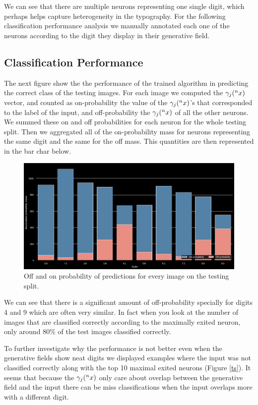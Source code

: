 \documentclass{article}
\begin{document}
We can see that there are multiple neurons representing one single digit, which perhaps helps capture heterogeneity in the typography. For the following classification performance analysis we manually annotated each one of the neurons according to the digit they display in their generative field. 

\subsection{Classification Performance}
The next figure show the the performance of the trained algorithm in predicting the correct class of the testing images. For each image we computed the \(\gamma_j(\prescript{n}{}{x})\) vector, and counted as on-probability the value of the \(\gamma_j(\prescript{n}{}{x})\)'s that corresponded to the label of the input, and off-probability the  \(\gamma_j(\prescript{n}{}{x})\) of all the other neurons. We summed these on and off probabilities for each neuron for the whole testing split. Then we aggregated all of the on-probability mass for neurons representing the same digit and the same for the off mass. This quantities are then represented in the bar char below.

\begin{figure}[h]
    \includegraphics[width=\textwidth]{img/output_47_0.png}
    \caption{Off and on probability of predictions for every image on the testing split. \label{on-off}}
\end{figure}

We can see that there is a significant amount of off-probability specially for digits 4 and 9 which are often very similar. In fact when you look at the number of images that are classified correctly according to the maximally exited neuron, only around 80\% of the test images classified correctly. 

To further investigate why the performance is not better even when the generative fields show neat digits we displayed examples where the input was not classified correctly along with the top 10 maximal exited neurons (Figure \ref{ts}). It seems that because the \(\gamma_j(\prescript{n}{}{x})\) only care about overlap between the generative field and the input there can be miss classifications when the input overlaps more with a different digit. 
\end{document}
